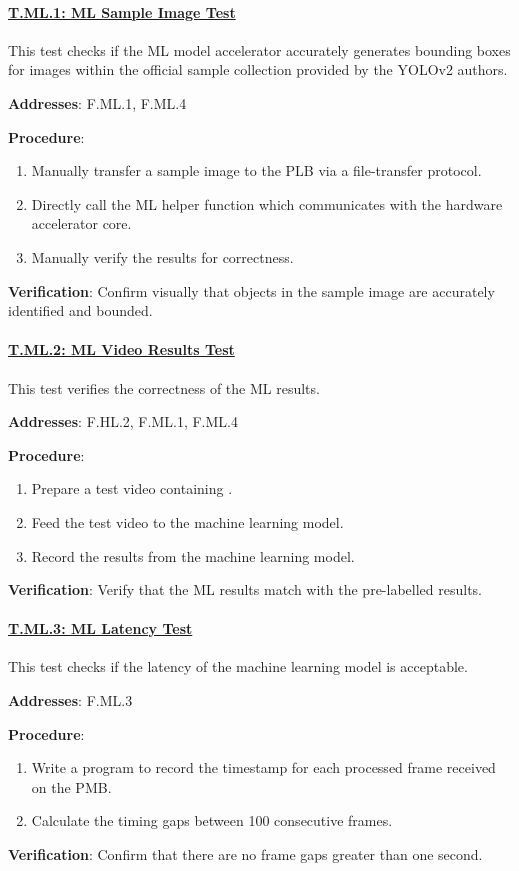 \paragraph{\underline{T.ML.1: ML Sample Image Test}}

This test checks if the ML model accelerator accurately generates bounding boxes for images within the official sample collection provided by the YOLOv2 authors.

\textbf{Addresses}: F.ML.1, F.ML.4

\textbf{Procedure}:
\begin{enumerate}[noitemsep]
    \item Manually transfer a sample image to the PLB via a file-transfer protocol.
    \item Directly call the ML helper function which communicates with the hardware accelerator core.
    \item Manually verify the results for correctness.
\end{enumerate}

\textbf{Verification}: 
Confirm visually that objects in the sample image are accurately identified and bounded.

\paragraph{\underline{T.ML.2: ML Video Results Test}}

This test verifies the correctness of the ML results.

\textbf{Addresses}: F.HL.2, F.ML.1, F.ML.4

\textbf{Procedure}:
\begin{enumerate}[noitemsep]
    \item Prepare a test video containing .
    \item Feed the test video to the machine learning model.
    \item Record the results from the machine learning model.
\end{enumerate}

\textbf{Verification}: 
Verify that the ML results match with the pre-labelled results.

%
\paragraph{\underline{T.ML.3: ML Latency Test}}

This test checks if the latency of the machine learning model is acceptable.

\textbf{Addresses}: F.ML.3

\textbf{Procedure}:
\begin{enumerate}[noitemsep]
    \item Write a program to record the timestamp for each processed frame received on the PMB.
    \item Calculate the timing gaps between 100 consecutive frames.
\end{enumerate}

\textbf{Verification}: 
Confirm that there are no frame gaps greater than one second.